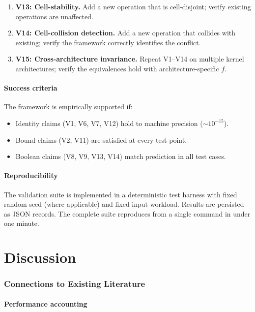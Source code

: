\documentclass[twocolumn,11pt,a4paper]{article}
\begin{document}
\begin{enumerate}[nosep,leftmargin=*]
\item \textbf{V13: Cell-stability.} Add a new operation that is cell-disjoint; verify existing operations are unaffected.
\item \textbf{V14: Cell-collision detection.} Add a new operation that collides with existing; verify the framework correctly identifies the conflict.
\item \textbf{V15: Cross-architecture invariance.} Repeat V1--V14 on multiple kernel architectures; verify the equivalences hold with architecture-specific $f$.
\end{enumerate}

\subsection{Success criteria}

The framework is empirically supported if:
\begin{itemize}[nosep,leftmargin=*]
\item Identity claims (V1, V6, V7, V12) hold to machine precision ($\sim 10^{-15}$).
\item Bound claims (V2, V11) are satisfied at every test point.
\item Boolean claims (V8, V9, V13, V14) match prediction in all test cases.
\end{itemize}

\subsection{Reproducibility}

The validation suite is implemented in a deterministic test harness with fixed random seed (where applicable) and fixed input workload. Results are persisted as JSON records. The complete suite reproduces from a single command in under one minute.

\part{Discussion}

\section{Connections to Existing Literature}
\label{sec:connections}

\subsection{Performance accounting}
\end{document}
